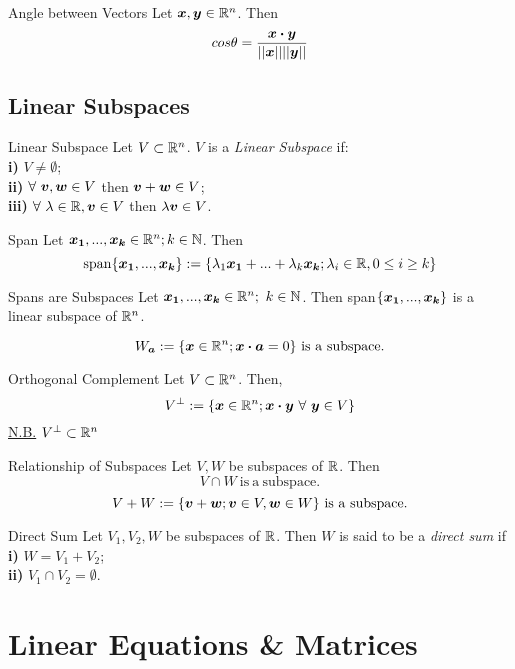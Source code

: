 \documentclass[11pt,a4paper]{article}
\begin{document}
\subtitle{Theorem 2.10 - }{Angle between Vectors}
Let $\boldsymbol{x}, \boldsymbol{y} \in \mathbb{R}^n$. Then $$cos\theta = \frac{\boldsymbol{x} \boldsymbol{\cdot} \boldsymbol{y}}{||\boldsymbol{x}|| ||\boldsymbol{y}||}$$

\subsection{Linear Subspaces}
%
\subtitle{Definition 2.11 - }{Linear Subspace}
Let $V \subset \mathbb{R}^n$. $V$ is a \textit{Linear Subspace} if: \\
\textbf{i)} $V \not = \emptyset$; \\
\textbf{ii)} $\forall\ \boldsymbol{v}, \boldsymbol{w} \in V$ then $\boldsymbol{v} + \boldsymbol{w} \in V$; \\
\textbf{iii)} $\forall\ \lambda \in \mathbb{R}, \boldsymbol{v} \in V$ then $\lambda\boldsymbol{v} \in V$. \\

\subtitle{Definition 2.12 - }{Span}
Let $\boldsymbol{x_1}, ... , \boldsymbol{x_k} \in \mathbb{R}^n; k \in \mathbb{N}$. Then
$$\mathrm{span}\{\boldsymbol{x_1}, ... , \boldsymbol{x_k}\} := \{\lambda_1\boldsymbol{x_1} + ... + \lambda_k\boldsymbol{x_k}; \lambda_i \in \mathbb{R}, 0 \leq i \geq k\}$$

\subtitle{Definition 2.13 - }{Spans are Subspaces}
Let $\boldsymbol{x_1}, ... , \boldsymbol{x_k} \in \mathbb{R}^n;\ k \in \mathbb{N}$. Then span$\{\boldsymbol{x_1}, ... , \boldsymbol{x_k}\}$ is a linear subspace of $\mathbb{R}^n$. \\

\subtitle{Theorem 2.14}{}
$$W_{\boldsymbol{a}} := \{\boldsymbol{x} \in \mathbb{R}^n; \boldsymbol{x} \boldsymbol{\cdot} \boldsymbol{a} = 0\}\mathrm{\ is\ a\ subspace.}$$

\subtitle{Definition 2.15 - }{Orthogonal Complement}
Let $V \subset \mathbb{R}^n$. Then,
$$V^{\perp} := \{\boldsymbol{x} \in \mathbb{R}^n; \boldsymbol{x} \boldsymbol{\cdot} \boldsymbol{y}\ \forall\ \boldsymbol{y} \in V\}$$
\underline{N.B.} $V^{\perp} \subset \mathbb{R}^n$

\subtitle{Theorem 2.16 - }{Relationship of Subspaces}
Let $V, W$ be subspaces of $\mathbb{R}$. Then
$$V \cap W \mathrm{\ is\ a\ subspace.}$$
$$V+W := \{\boldsymbol{v} + \boldsymbol{w}; \boldsymbol{v} \in V, \boldsymbol{w} \in W\}\mathrm{\ is\ a\ subspace.}$$

\subtitle{Definition 2.17 - }{Direct Sum}
Let $V_1, V_2, W$ be subspaces of $\mathbb{R}$. Then $W$ is said to be a \textit{direct sum} if \\
\textbf{i)} $W = V_1 + V_2$; \\
\textbf{ii)} $V_1 \cap V_2 = \emptyset$. \\

\section{Linear Equations \& Matrices}
\end{document}
